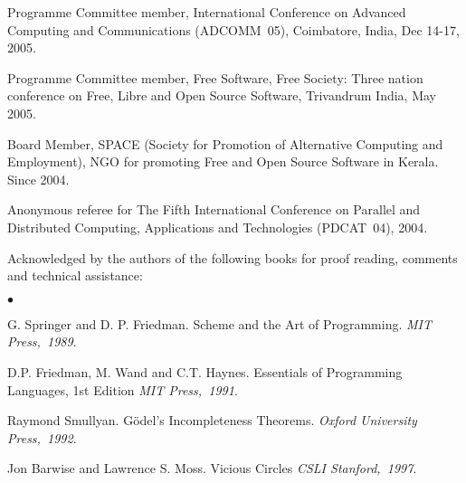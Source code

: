 \documentclass[11pt,margin,line]{res}
\newenvironment{list2}{
  \begin{list}{$\bullet$}{%
      \setlength{\itemsep}{0in}
      \setlength{\parsep}{0in} \setlength{\parskip}{0in}
      \setlength{\topsep}{0in} \setlength{\partopsep}{0in} 
      \setlength{\leftmargin}{0.2in}}}{\end{list}}
\begin{document}
\begin{resume}
Programme Committee member, International Conference on
Advanced Computing and Communications (ADCOMM~05),
Coimbatore, India, Dec 14-17, 2005.

Programme Committee member, Free Software, Free Society: Three
nation conference on Free, Libre and Open Source Software,
Trivandrum India, May 2005.

Board Member, SPACE (Society for Promotion of Alternative
Computing and Employment), NGO for promoting Free and Open
Source Software in Kerala. Since 2004.

Anonymous referee for The Fifth International Conference on
Parallel and Distributed Computing, Applications and
Technologies (PDCAT~04), 2004.  

Acknowledged by the authors of the following books for
proof reading, comments  and technical assistance:\\
\begin{list2}
 \item G. Springer and D. P. Friedman.  {Scheme and the Art of
 Programming}.  {\em {MIT Press,~1989}}.
 \item D.P. Friedman, M. Wand and C.T. Haynes.  Essentials of
 Programming Languages, 1st Edition  {\em {MIT Press,~1991}}.
 \item Raymond Smullyan. G\"{o}del's Incompleteness Theorems.
 {\em {Oxford University Press,~1992}}.
 \item Jon Barwise and Lawrence S. Moss. Vicious Circles
 {\em {CSLI Stanford,~1997}}.
\end{list2}







\end{resume}
\end{document}
